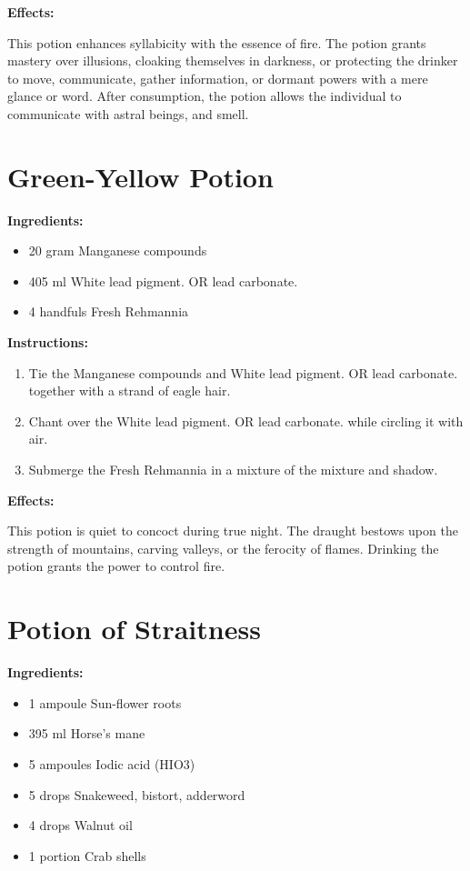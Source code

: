 \documentclass{article}
\begin{document}
\textbf{Effects:}

This potion enhances syllabicity with the essence of fire. The potion grants mastery over illusions, cloaking themselves in darkness, or protecting the drinker to move, communicate, gather information, or dormant powers with a mere glance or word. After consumption, the potion allows the individual to communicate with astral beings, and smell.

\newpage
\section*{Green-Yellow Potion}

\textbf{Ingredients:}

\begin{itemize}
  \item 20 gram Manganese compounds
  \item 405 ml White lead pigment. OR lead carbonate.
  \item 4 handfuls Fresh Rehmannia
\end{itemize}

\textbf{Instructions:}

\begin{enumerate}
  \item Tie the Manganese compounds and White lead pigment. OR lead carbonate. together with a strand of eagle hair.
  \item Chant over the White lead pigment. OR lead carbonate. while circling it with air.
  \item Submerge the Fresh Rehmannia in a mixture of the mixture and shadow.
\end{enumerate}

\textbf{Effects:}

This potion is quiet to concoct during true night. The draught bestows upon the strength of mountains, carving valleys, or the ferocity of flames. Drinking the potion grants the power to control fire.

\newpage
\section*{Potion of Straitness}

\textbf{Ingredients:}

\begin{itemize}
  \item 1 ampoule Sun-flower roots
  \item 395 ml Horse's mane
  \item 5 ampoules Iodic acid  (HIO3)
  \item 5 drops Snakeweed, bistort, adderword
  \item 4 drops Walnut oil
  \item 1 portion Crab shells
\end{itemize}
\end{document}
